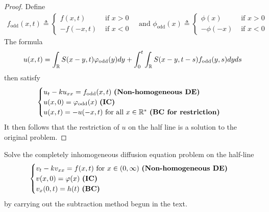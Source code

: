 \documentclass{report}
\begin{document}
\begin{proof}
Define 
\begin{align*}
f_{\operatorname{odd}}(x,t)\triangleq \begin{cases}
  f(x,t)& \text{ if $x>0$ }\\
  -f(-x,t)& \text{ if $x<0$ }
\end{cases}\text{ and }\phi_{\operatorname{odd}}(x)\triangleq \begin{cases}
  \phi (x)& \text{ if $x>0$ }\\
  -\phi (-x)& \text{ if $x<0$ }
\end{cases}
\end{align*}
The formula 
\begin{align*}
u(x,t)=\int_{\R} S(x-y,t)\phi_{\operatorname{odd}} (y)dy+ \int_0^t \int_{\R}S(x-y,t-s)f_{\operatorname{odd}}(y,s)dyds
\end{align*}
then satisfy 
\begin{align*}
\begin{cases}
  u_t-ku_{xx}=f_{\operatorname{odd}}(x,t)\text{ \textbf{(Non-homogeneous DE)} }\\
  u(x,0)=\phi_{\operatorname{odd}} (x)\text{ \textbf{(IC)} }\\
  u(x,t)=-u(-x,t)\text{ for all $x\inr^*$ \textbf{(BC for restriction)}}
\end{cases}
\end{align*}
It then follows that the restriction of $u$ on the half line is a solution to the original problem. 
\end{proof}
\begin{question}{}{}
Solve the completely inhomogeneous diffusion equation problem on the half-line 
\begin{align*}
  \begin{cases}
    v_t-kv_{xx}=f(x,t)\text{ for $x\in (0,\infty)$ \textbf{(Non-homogeneous DE)}}  \\
v(x,0)=\phi (x)\text{ \textbf{(IC)} }\\
    v_x(0,t)=h(t) \text{ \textbf{(BC)} }
  \end{cases}
\end{align*}
by carrying out the subtraction method begun in the text. 
\end{question}
\end{document}
